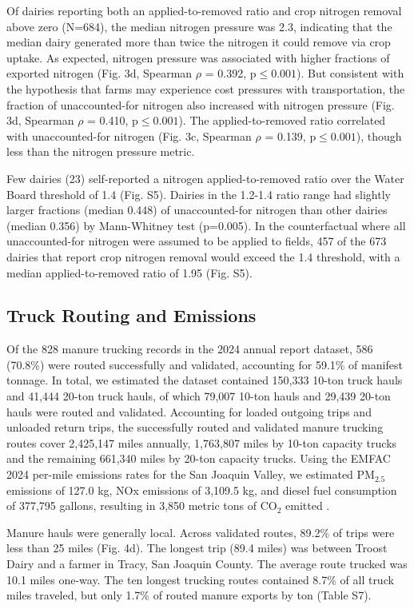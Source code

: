 \documentclass{iopjournal}
\begin{document}
Of dairies reporting both an applied-to-removed ratio and crop nitrogen removal above zero (N=684), the median nitrogen pressure was 2.3, indicating that the median dairy generated more than twice the nitrogen it could remove via crop uptake. As expected, nitrogen pressure was associated with higher fractions of exported nitrogen (Fig. 3d, Spearman $\rho$ = 0.392, p$\leq0.001$). But consistent with the hypothesis that farms may experience cost pressures with transportation, the fraction of unaccounted-for nitrogen also increased with nitrogen pressure (Fig. 3d, Spearman $\rho$ = 0.410, p$\leq0.001$). The applied-to-removed ratio correlated with unaccounted-for nitrogen (Fig. 3c, Spearman $\rho$ = 0.139, p$\leq0.001$), though less than the nitrogen pressure metric.

Few dairies (23) self-reported a nitrogen applied-to-removed ratio over the Water Board threshold of 1.4 (Fig. S5). Dairies in the 1.2-1.4 ratio range had slightly larger fractions (median 0.448) of unaccounted-for nitrogen than other dairies (median 0.356) by Mann-Whitney test (p=0.005). In the counterfactual where all unaccounted-for nitrogen were assumed to be applied to fields, 457 of the 673 dairies that report crop nitrogen removal would exceed the 1.4 threshold, with a median applied-to-removed ratio of 1.95 (Fig. S5).

\subsection{Truck Routing and Emissions}

Of the 828 manure trucking records in the 2024 annual report dataset, 586 (70.8\%) were routed successfully and validated, accounting for 59.1\% of manifest tonnage. In total, we estimated the dataset contained 150,333 10-ton truck hauls and 41,444 20-ton truck hauls, of which 79,007 10-ton hauls and 29,439 20-ton hauls were routed and validated. Accounting for loaded outgoing trips and unloaded return trips, the successfully routed and validated manure trucking routes cover 2,425,147 miles annually, 1,763,807 miles by 10-ton capacity trucks and the remaining 661,340 miles by 20-ton capacity trucks. Using the EMFAC 2024 per-mile emissions rates for the San Joaquin Valley, we estimated PM$_{\text{2.5}}$ emissions of 127.0 kg, NOx emissions of 3,109.5 kg, and diesel fuel consumption of 377,795 gallons, resulting in 3,850 metric tons of CO$_{\text{2}}$ emitted \cite{EMFAC_Emissions}.

Manure hauls were generally local. Across validated routes, 89.2\% of trips were less than 25 miles (Fig. 4d). The longest trip (89.4 miles) was between Troost Dairy and a farmer in Tracy, San Joaquin County. The average route trucked was 10.1 miles one-way. The ten longest trucking routes contained 8.7\% of all truck miles traveled, but only 1.7\% of routed manure exports by ton (Table S7).
\end{document}
